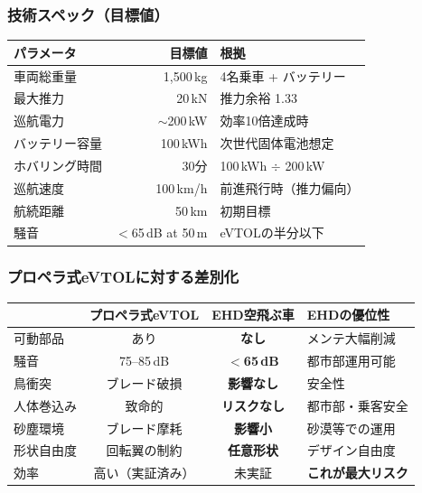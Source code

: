 \documentclass[12pt,a4paper]{ltjsarticle}
\begin{document}
\subsubsection{技術スペック（目標値）}

\begin{center}
\sffamily
\begin{tabular}{@{}lrl@{}}
\toprule
\textbf{パラメータ} & \textbf{目標値} & \textbf{根拠} \\
\midrule
車両総重量 & 1,500\,kg & 4名乗車 + バッテリー \\
最大推力 & 20\,kN & 推力余裕 1.33 \\
巡航電力 & $\sim$200\,kW & 効率10倍達成時 \\
バッテリー容量 & 100\,kWh & 次世代固体電池想定 \\
ホバリング時間 & 30分 & 100\,kWh $\div$ 200\,kW \\
巡航速度 & 100\,km/h & 前進飛行時（推力偏向） \\
航続距離 & 50\,km & 初期目標 \\
騒音 & $<$65\,dB at 50\,m & eVTOLの半分以下 \\
\bottomrule
\end{tabular}
\end{center}

\subsubsection{プロペラ式eVTOLに対する差別化}

\begin{center}
\sffamily\small
\begin{tabular}{@{}lccp{4cm}@{}}
\toprule
& \textbf{プロペラ式eVTOL} & \textbf{EHD空飛ぶ車} & \textbf{EHDの優位性} \\
\midrule
可動部品 & あり & \textbf{なし} & メンテ大幅削減 \\
騒音 & 75--85\,dB & \textbf{$<$65\,dB} & 都市部運用可能 \\
鳥衝突 & ブレード破損 & \textbf{影響なし} & 安全性 \\
人体巻込み & 致命的 & \textbf{リスクなし} & 都市部・乗客安全 \\
砂塵環境 & ブレード摩耗 & \textbf{影響小} & 砂漠等での運用 \\
形状自由度 & 回転翼の制約 & \textbf{任意形状} & デザイン自由度 \\
効率 & 高い（実証済み） & 未実証 & \textbf{これが最大リスク} \\
\bottomrule
\end{tabular}
\end{center}
\end{document}
